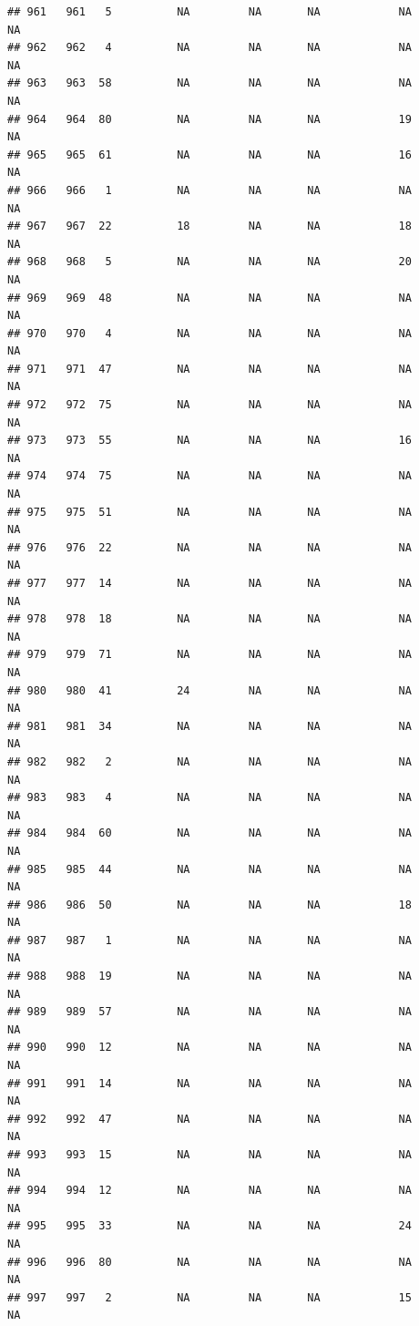 \documentclass[man]{apa6}
\begin{document}
\begin{verbatim}
## 961   961   5          NA         NA       NA            NA       NA
## 962   962   4          NA         NA       NA            NA       NA
## 963   963  58          NA         NA       NA            NA       NA
## 964   964  80          NA         NA       NA            19       NA
## 965   965  61          NA         NA       NA            16       NA
## 966   966   1          NA         NA       NA            NA       NA
## 967   967  22          18         NA       NA            18       NA
## 968   968   5          NA         NA       NA            20       NA
## 969   969  48          NA         NA       NA            NA       NA
## 970   970   4          NA         NA       NA            NA       NA
## 971   971  47          NA         NA       NA            NA       NA
## 972   972  75          NA         NA       NA            NA       NA
## 973   973  55          NA         NA       NA            16       NA
## 974   974  75          NA         NA       NA            NA       NA
## 975   975  51          NA         NA       NA            NA       NA
## 976   976  22          NA         NA       NA            NA       NA
## 977   977  14          NA         NA       NA            NA       NA
## 978   978  18          NA         NA       NA            NA       NA
## 979   979  71          NA         NA       NA            NA       NA
## 980   980  41          24         NA       NA            NA       NA
## 981   981  34          NA         NA       NA            NA       NA
## 982   982   2          NA         NA       NA            NA       NA
## 983   983   4          NA         NA       NA            NA       NA
## 984   984  60          NA         NA       NA            NA       NA
## 985   985  44          NA         NA       NA            NA       NA
## 986   986  50          NA         NA       NA            18       NA
## 987   987   1          NA         NA       NA            NA       NA
## 988   988  19          NA         NA       NA            NA       NA
## 989   989  57          NA         NA       NA            NA       NA
## 990   990  12          NA         NA       NA            NA       NA
## 991   991  14          NA         NA       NA            NA       NA
## 992   992  47          NA         NA       NA            NA       NA
## 993   993  15          NA         NA       NA            NA       NA
## 994   994  12          NA         NA       NA            NA       NA
## 995   995  33          NA         NA       NA            24       NA
## 996   996  80          NA         NA       NA            NA       NA
## 997   997   2          NA         NA       NA            15       NA

\end{verbatim}
\end{document}
